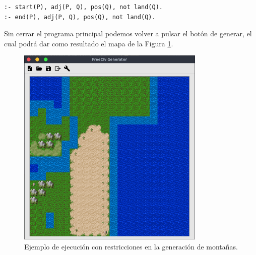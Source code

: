 \begin{lstlisting}
:- start(P), adj(P, Q), pos(Q), not land(Q).
:- end(P), adj(P, Q), pos(Q), not land(Q).
\end{lstlisting}

Sin cerrar el programa principal podemos volver a pulsar el botón de generar, el cual podrá dar como resultado el mapa de la Figura \ref{fig:mountains}.

\begin{figure}[!h]
	\centering
	\includegraphics[width=0.8\textwidth]{images/result-mountains.png}
	\caption{Ejemplo de ejecución con restricciones en la generación de montañas.}
	\label{fig:mountains}
\end{figure}